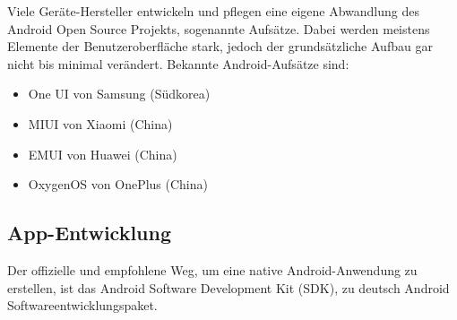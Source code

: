 Viele Geräte-Hersteller entwickeln und pflegen eine eigene Abwandlung des Android Open Source
Projekts, sogenannte Aufsätze. Dabei werden meistens Elemente der Benutzeroberfläche stark, jedoch
der grundsätzliche Aufbau gar nicht bis minimal verändert. Bekannte Android-Aufsätze sind:

\begin{itemize}
  \item One UI von Samsung (Südkorea)
  \item MIUI von Xiaomi (China)
  \item EMUI von Huawei (China)
  \item OxygenOS von OnePlus (China)
\end{itemize}

\subsection{App-Entwicklung}
Der offizielle und empfohlene Weg, um eine native Android-Anwendung zu erstellen, ist das
Android Software Development Kit (SDK), zu deutsch Android Softwareentwicklungspaket. 
